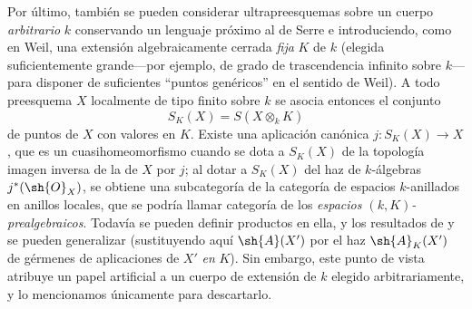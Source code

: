 \begin{env}[10.10.5]
\label{IV.10.10.5}
Por último, también se pueden considerar ultrapreesquemas sobre un cuerpo \emph{arbitrario} $k$
conservando un lenguaje próximo al de Serre e introduciendo, como en Weil, una
extensión algebraicamente cerrada \emph{fija} $K$ de $k$ (elegida suficientemente grande---por ejemplo,
de grado de trascendencia infinito sobre $k$---para disponer de suficientes ``puntos genéricos''
en el sentido de Weil).
A todo preesquema $X$ localmente de tipo finito sobre $k$ se asocia entonces el conjunto
\[
 S_K(X)=S(X\otimes_k K)
\]
de puntos de $X$ con valores en $K$.
Existe una aplicación canónica $j:S_K(X)\to X$, que es un cuasihomeomorfismo cuando
se dota a $S_K(X)$ de la topología imagen inversa de la de $X$ por $j$; al dotar a $S_K(X)$
del haz de $k$-álgebras $j^*(\sh{O}_X)$, se obtiene una subcategoría de la categoría
de espacios $k$-anillados en anillos locales, que se podría llamar categoría de los
\emph{espacios $(k,K)$-prealgebraicos}.
Todavía se pueden definir productos en ella, y los resultados de  y
 se pueden generalizar (sustituyendo aquí $\sh{A}(X')$ por el haz
$\sh{A}_K(X')$ de gérmenes de aplicaciones de $X'$ \emph{en} $K$).
Sin embargo, este punto de vista atribuye un papel artificial a un cuerpo de extensión
de $k$ elegido arbitrariamente, y lo mencionamos únicamente para descartarlo.
\end{env}
